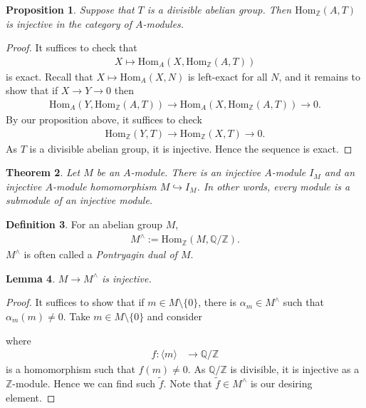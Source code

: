 \documentclass[12pt]{report}
\theoremstyle{plain}
\newtheorem{theorem}{Theorem}[section]
\newtheorem{lemma}[theorem]{Lemma}
\newtheorem{proposition}[theorem]{Proposition}
\theoremstyle{remark}
\theoremstyle{definition}
\newtheorem{definition}[theorem]{Definition}
\newcommand{\Z}{\mathbb{Z}}
\newcommand{\Q}{\mathbb{Q}}
\newcommand{\Hom}[3]{\mathrm{Hom}_{#3}(#1,#2)}
\begin{document}
\begin{proposition}
    Suppose that $T$ is a divisible abelian group. Then $\Hom{A}{T}{\Z}$ is injective in the category of $A$-modules.
\end{proposition}
\begin{proof}
    It suffices to check that
    \begin{align*}
        X\mapsto \Hom{X}{\Hom{A}{T}{\Z}}{A}
    \end{align*}
    is exact. Recall that $X\mapsto \Hom{X}{N}{A}$ is left-exact for all $N$, and it remains to show that if $X\rightarrow Y\rightarrow 0$ then
    \begin{align*}
        \Hom{Y}{\Hom{A}{T}{\Z}}{A}\rightarrow \Hom{X}{\Hom{A}{T}{\Z}}{A} \rightarrow 0.
    \end{align*}
    By our proposition above, it suffices to check
    \begin{align*}
        \Hom{Y}{T}{\Z}\rightarrow \Hom{X}{T}{\Z}\rightarrow 0.
    \end{align*}
    As $T$ is a divisible abelian group, it is injective. Hence the sequence is exact.
\end{proof}

\begin{theorem}\label{Theorem 2.7.8.}
    Let $M$ be an $A$-module. There is an injective $A$-module $I_M$ and an injective $A$-module homomorphism $M\hookrightarrow I_M$. In other words, every module is a submodule of an injective module.
\end{theorem}

\begin{definition}
    For an abelian group $M$,
    \begin{align*}
        M^\wedge := \Hom{M}{\Q/\Z}{\Z}.
    \end{align*}
    $M^\wedge$ is often called a \emph{Pontryagin dual of $M$}.
\end{definition}

\begin{lemma}
    $M\rightarrow M^{\wedge}$ is injective.
\end{lemma}
\begin{proof}
    It suffices to show that if $m\in M\setminus\{0\}$, there is $\alpha_m\in M^\wedge$ such that $\alpha_m(m)\neq 0$. Take $m\in M\setminus\{0\}$ and consider
    \begin{figure}[H]
        \centering
    \end{figure}
    \noindent where
    \begin{align*}
        f:\langle m\rangle &\rightarrow \Q/\Z 
    \end{align*}
    is a homomorphism such that $f(m)\neq 0$. As $\Q/\Z$ is divisible, it is injective as a $\Z$-module. Hence we can find such $\tilde{f}$. Note that $\tilde{f}\in M^\wedge$ is our desiring element.
\end{proof}
\end{document}
